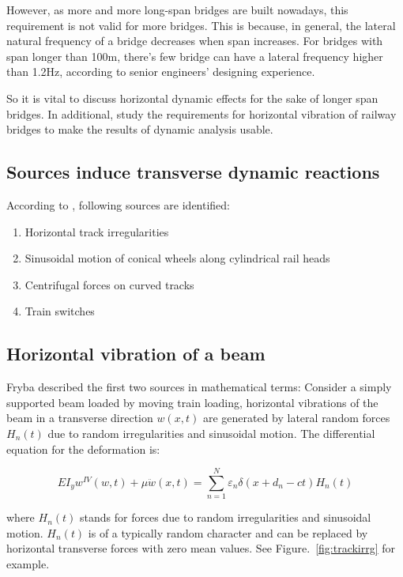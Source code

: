 However, as more and more long-span bridges are built nowadays, this requirement is not valid for more bridges. This is because, in general, the lateral natural frequency of a bridge decreases when span increases. For bridges with span longer than 100m, there's few bridge can have a lateral frequency higher than 1.2Hz, according to senior engineers' designing experience.

So it is vital to discuss horizontal dynamic effects for the sake of longer span bridges. In additional, study the requirements for horizontal vibration of railway bridges to make the results of dynamic analysis usable.

\subsection{Sources induce transverse dynamic reactions}
According to \cite{da2007dynamic}\cite{fryba1996dynamics}\cite{EC12}, following sources are identified:

\begin{enumerate} [-]
	\item Horizontal track irregularities
	\item Sinusoidal motion of conical wheels along cylindrical rail heads
	\item Centrifugal forces on curved tracks
	\item Train switches
\end{enumerate}

\subsection{Horizontal vibration of a beam}

Fryba\cite{fryba1996dynamics} described the first two sources in mathematical terms:
Consider a simply supported beam loaded by moving train loading, horizontal vibrations of the beam in a transverse direction $ w(x,t) $ are generated by lateral random forces $ H_n (t) $ due to random irregularities and sinusoidal motion. The differential equation for the deformation is:

\begin{equation}
	EI_yw^{IV}(w,t)+\mu \ddot{w} (x,t)=\sum_{n=1}^{N} \varepsilon_n\delta(x+d_n-ct)H_n(t) 
\end{equation}

where $ H_n(t) $ stands for forces due to random irregularities and sinusoidal motion. $ H_n(t) $ is of a typically random character and can be replaced by horizontal transverse forces with zero mean values. See Figure.~\ref{fig:trackirrg} for example.

